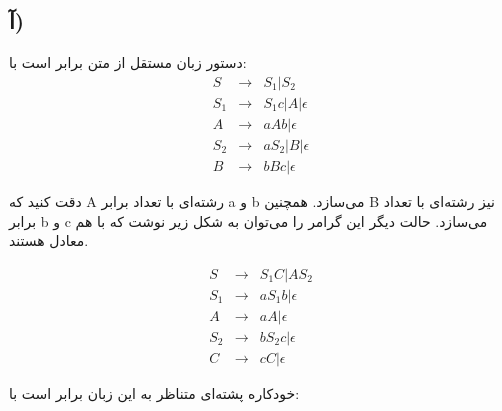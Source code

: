 \subsection*{آ)}

دستور زبان مستقل از متن برابر است با:
\begin{eqnarray*}
    S &\rightarrow& S_1 | S_2 \\
    S_1 &\rightarrow& S_1c | A | \epsilon \\
    A &\rightarrow& aAb| \epsilon \\
    S_2 &\rightarrow& aS_2 | B | \epsilon \\
    B &\rightarrow& bBc|\epsilon 
\end{eqnarray*}

دقت کنید که A رشته‌ای با تعداد برابر a و b می‌سازد. همچنین B نیز رشته‌ای با تعداد برابر b و c می‌سازد. حالت دیگر این گرامر را می‌توان به شکل زیر نوشت که با هم معادل هستند.

\begin{eqnarray*}
    S &\rightarrow& S_1C|AS_2 \\
    S_1 &\rightarrow& aS_1b|\epsilon\\
    A &\rightarrow& aA|\epsilon\\
    S_2 &\rightarrow& bS_2c|\epsilon\\
    C &\rightarrow& cC|\epsilon
\end{eqnarray*}

خودکاره پشته‌ای متناظر به این زبان برابر است با:

